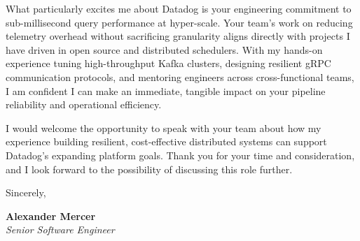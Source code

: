 \documentclass[letterpaper,11pt]{article}
\begin{document}
What particularly excites me about Datadog is your engineering commitment to sub-millisecond query performance at hyper-scale. Your team's work on reducing telemetry overhead without sacrificing granularity aligns directly with projects I have driven in open source and distributed schedulers. With my hands-on experience tuning high-throughput Kafka clusters, designing resilient gRPC communication protocols, and mentoring engineers across cross-functional teams, I am confident I can make an immediate, tangible impact on your pipeline reliability and operational efficiency.

I would welcome the opportunity to speak with your team about how my experience building resilient, cost-effective distributed systems can support Datadog’s expanding platform goals. Thank you for your time and consideration, and I look forward to the possibility of discussing this role further.

\vspace{12pt}
Sincerely,

\vspace{4pt}
\textbf{Alexander Mercer} \\
\textit{Senior Software Engineer}
\end{document}
